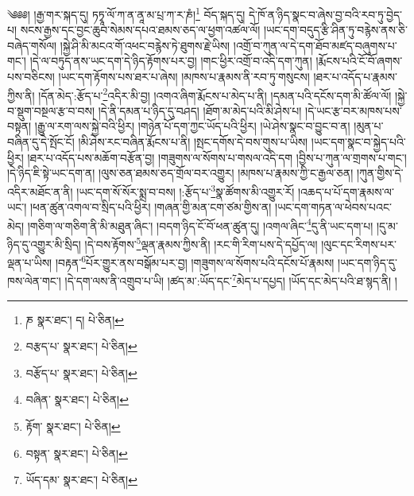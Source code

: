 \setcounter{footnote}{0} 
༄༅༅། །རྒྱ་གར་སྐད་དུ། ཏཏྭཱ་ལོ་ཀ་ན་ནཱ་མ་པྲ་ཀ་ར་ཎཾ།\footnote{ཎ  སྣར་ཐང་། ད།  པེ་ཅིན། } བོད་སྐད་དུ། དེ་ཁོ་ན་ཉིད་སྣང་བ་ཞེས་བྱ་བའི་རབ་ཏུ་བྱེད་པ། སངས་རྒྱས་དང་བྱང་ཆུབ་སེམས་དཔའ་ཐམས་ཅད་ལ་ཕྱག་འཚལ་ལོ། །ཡང་དག་བདུད་རྩི་ཤིན་ཏུ་བརྙེས་ནས་ཅི་བཞེད་གསོལ། །སྐྱེ་ཤི་མི་མངའ་གོ་འཕང་བརྙེས་ཏེ་ཐུགས་རྗེ་ཡིས། །འགྲོ་བ་ཀུན་ལ་དེ་དག་ཐོབ་མཛད་བཞུགས་པ་གང་། །དེ་ལ་བཏུད་ནས་ཡང་དག་དེ་ཉིད་རྟོགས་པར་བྱ། །གང་ཕྱིར་འགྲོ་བ་འདི་དག་ཀུན། །རྨོངས་པའི་ངོ་བོ་ཞགས་པས་བཅིངས། །ཡང་དག་རྟོགས་པས་ཐར་པ་ཞེས། །མཁས་པ་རྣམས་ནི་རབ་ཏུ་གསུངས། །ཐར་པ་འདོད་པ་རྣམས་ཀྱིས་ནི། །དོན་མེད་:རྩོད་པ་\footnote{བརྩད་པ་  སྣར་ཐང་།  པེ་ཅིན། }འདིར་མི་བྱ། །འགའ་ཞིག་རྨོངས་པ་མེད་པ་ནི། །དམན་པའི་དངོས་དག་མི་ཚོལ་ལོ། །སྐྱེ་བ་སྡུག་བསྔལ་རྩ་བ་བས། །དེ་ནི་དམན་པ་ཉིད་དུ་བཤད། །ཐོག་མ་མེད་པའི་མི་ཤེས་པ། །དེ་ཡང་རྩ་བར་མཁས་པས་བསྟན། །རྒྱུ་ལ་རག་ལས་སྐྱེ་བའི་ཕྱིར། །གཉེན་པོ་དག་ཀྱང་ཡོད་པའི་ཕྱིར། །ཡེ་ཤེས་སྣང་བ་བྱུང་བ་ན། །མུན་པ་བཞིན་དུ་དེ་སྤོང་ངོ། །མི་ཤེས་རང་བཞིན་རྨོངས་པ་ནི། །སྤང་དགོས་དེ་བས་གུས་པ་ཡིས། །ཡང་དག་སྣང་བ་སྐྱེད་པའི་ཕྱིར། །ཐར་པ་འདོད་པས་མཆོག་བརྩོན་བྱ། །གཟུགས་ལ་སོགས་པ་གསལ་འདི་དག །བྱིས་པ་ཀུན་ལ་གྲགས་པ་གང་། །དེ་ཉིད་ཇི་སྟེ་ཡང་དག་ན། །ལུས་ཅན་ཐམས་ཅད་གྲོལ་བར་འགྱུར། །མཁས་པ་རྣམས་ཀྱི་ང་རྒྱལ་ཅན། །ཀུན་གྱིས་དེ་འདིར་མཐོང་ན་ནི། །ཡང་དག་སོ་སོར་སྨྲ་བ་བས། །:རྩོད་པ་\footnote{བརྩོད་པ་  སྣར་ཐང་།  པེ་ཅིན། }སྣ་ཚོགས་མི་འགྱུར་རོ། །འཆད་པ་པོ་དག་རྣམས་ལ་ཡང་། །ཕན་ཚུན་འགལ་བ་སྲིད་པའི་ཕྱིར། །གཞན་གྱི་མན་ངག་ཙམ་གྱིས་ན། །ཡང་དག་གཏན་ལ་ཕེབས་པའང་མེད། །གཅིག་ལ་གཅིག་ནི་མི་མཐུན་ཞིང་། །བདག་ཉིད་ངོ་བོ་ཕན་ཚུན་དུ། །འགལ་ཞིང་\footnote{བཞིན་  སྣར་ཐང་།  པེ་ཅིན། }དུ་ནི་ཡང་དག་པ། །དུ་མ་ཉིད་དུ་འགྱུར་མི་སྲིད། །དེ་བས་རྟོགས་\footnote{རྟོག་  སྣར་ཐང་།  པེ་ཅིན། }ལྡན་རྣམས་ཀྱིས་ནི། །རང་གི་རིག་པས་དེ་དཔྱོད་ལ། །ལུང་དང་རིགས་པར་ལྡན་པ་ཡིས། །བརྟན་\footnote{བསྟན་  སྣར་ཐང་།  པེ་ཅིན། }པོར་གྱུར་ནས་བསྒོམ་པར་བྱ། །གཟུགས་ལ་སོགས་པའི་དངོས་པོ་རྣམས། །ཡང་དག་ཉིད་དུ་ཁས་ལེན་གང་། །དེ་དག་ལས་ནི་འགྲུབ་པ་ཡི། །ཚད་མ་:ཡོད་དང་\footnote{ཡོད་དམ་  སྣར་ཐང་།  པེ་ཅིན། }མེད་པ་དཔྱད། །ཡོད་དང་མེད་པའི་ཐ་སྙད་ནི། །
